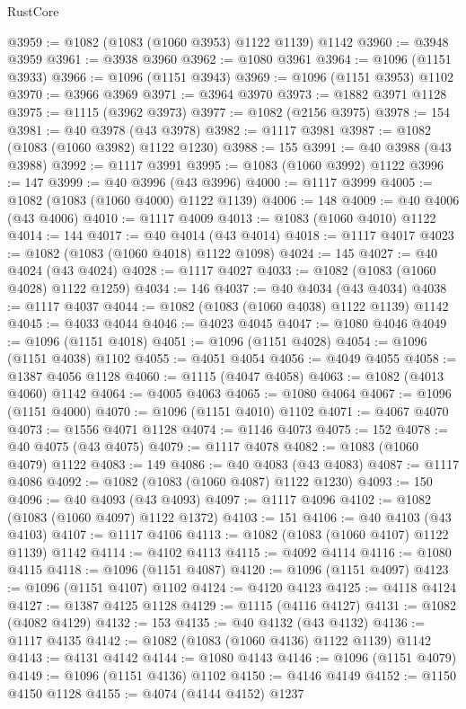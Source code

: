\begin{lexlean}{RustCore}
\begin{coremodule}
@3959 := @1082 (@1083 (@1060 @3953) @1122 @1139) @1142
@3960 := @3948 @3959
@3961 := @3938 @3960
@3962 := @1080 @3961
@3964 := @1096 (@1151 @3933)
@3966 := @1096 (@1151 @3943)
@3969 := @1096 (@1151 @3953) @1102
@3970 := @3966 @3969
@3971 := @3964 @3970
@3973 := @1882 @3971 @1128
@3975 := @1115 (@3962 @3973)
@3977 := @1082 (@2156 @3975)
@3978 := 154
@3981 := @40 @3978 (@43 @3978)
@3982 := @1117 @3981
@3987 := @1082 (@1083 (@1060 @3982) @1122 @1230)
@3988 := 155
@3991 := @40 @3988 (@43 @3988)
@3992 := @1117 @3991
@3995 := @1083 (@1060 @3992) @1122
@3996 := 147
@3999 := @40 @3996 (@43 @3996)
@4000 := @1117 @3999
@4005 := @1082 (@1083 (@1060 @4000) @1122 @1139)
@4006 := 148
@4009 := @40 @4006 (@43 @4006)
@4010 := @1117 @4009
@4013 := @1083 (@1060 @4010) @1122
@4014 := 144
@4017 := @40 @4014 (@43 @4014)
@4018 := @1117 @4017
@4023 := @1082 (@1083 (@1060 @4018) @1122 @1098)
@4024 := 145
@4027 := @40 @4024 (@43 @4024)
@4028 := @1117 @4027
@4033 := @1082 (@1083 (@1060 @4028) @1122 @1259)
@4034 := 146
@4037 := @40 @4034 (@43 @4034)
@4038 := @1117 @4037
@4044 := @1082 (@1083 (@1060 @4038) @1122 @1139) @1142
@4045 := @4033 @4044
@4046 := @4023 @4045
@4047 := @1080 @4046
@4049 := @1096 (@1151 @4018)
@4051 := @1096 (@1151 @4028)
@4054 := @1096 (@1151 @4038) @1102
@4055 := @4051 @4054
@4056 := @4049 @4055
@4058 := @1387 @4056 @1128
@4060 := @1115 (@4047 @4058)
@4063 := @1082 (@4013 @4060) @1142
@4064 := @4005 @4063
@4065 := @1080 @4064
@4067 := @1096 (@1151 @4000)
@4070 := @1096 (@1151 @4010) @1102
@4071 := @4067 @4070
@4073 := @1556 @4071 @1128
@4074 := @1146 @4073
@4075 := 152
@4078 := @40 @4075 (@43 @4075)
@4079 := @1117 @4078
@4082 := @1083 (@1060 @4079) @1122
@4083 := 149
@4086 := @40 @4083 (@43 @4083)
@4087 := @1117 @4086
@4092 := @1082 (@1083 (@1060 @4087) @1122 @1230)
@4093 := 150
@4096 := @40 @4093 (@43 @4093)
@4097 := @1117 @4096
@4102 := @1082 (@1083 (@1060 @4097) @1122 @1372)
@4103 := 151
@4106 := @40 @4103 (@43 @4103)
@4107 := @1117 @4106
@4113 := @1082 (@1083 (@1060 @4107) @1122 @1139) @1142
@4114 := @4102 @4113
@4115 := @4092 @4114
@4116 := @1080 @4115
@4118 := @1096 (@1151 @4087)
@4120 := @1096 (@1151 @4097)
@4123 := @1096 (@1151 @4107) @1102
@4124 := @4120 @4123
@4125 := @4118 @4124
@4127 := @1387 @4125 @1128
@4129 := @1115 (@4116 @4127)
@4131 := @1082 (@4082 @4129)
@4132 := 153
@4135 := @40 @4132 (@43 @4132)
@4136 := @1117 @4135
@4142 := @1082 (@1083 (@1060 @4136) @1122 @1139) @1142
@4143 := @4131 @4142
@4144 := @1080 @4143
@4146 := @1096 (@1151 @4079)
@4149 := @1096 (@1151 @4136) @1102
@4150 := @4146 @4149
@4152 := @1150 @4150 @1128
@4155 := @4074 (@4144 @4152) @1237

\end{coremodule}
\end{lexlean}
